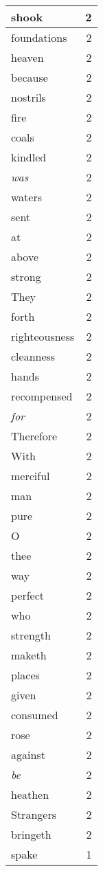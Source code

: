 \begin{center}
\begin{longtable}{l|r}
shook & 2 \\ \hline
foundations & 2 \\ \hline
heaven & 2 \\ \hline
because & 2 \\ \hline
nostrils & 2 \\ \hline
fire & 2 \\ \hline
coals & 2 \\ \hline
kindled & 2 \\ \hline
\emph{was} & 2 \\ \hline
waters & 2 \\ \hline
sent & 2 \\ \hline
at & 2 \\ \hline
above & 2 \\ \hline
strong & 2 \\ \hline
They & 2 \\ \hline
forth & 2 \\ \hline
righteousness & 2 \\ \hline
cleanness & 2 \\ \hline
hands & 2 \\ \hline
recompensed & 2 \\ \hline
\emph{for} & 2 \\ \hline
Therefore & 2 \\ \hline
With & 2 \\ \hline
merciful & 2 \\ \hline
man & 2 \\ \hline
pure & 2 \\ \hline
O & 2 \\ \hline
thee & 2 \\ \hline
way & 2 \\ \hline
perfect & 2 \\ \hline
who & 2 \\ \hline
strength & 2 \\ \hline
maketh & 2 \\ \hline
places & 2 \\ \hline
given & 2 \\ \hline
consumed & 2 \\ \hline
rose & 2 \\ \hline
against & 2 \\ \hline
\emph{be} & 2 \\ \hline
heathen & 2 \\ \hline
Strangers & 2 \\ \hline
bringeth & 2 \\ \hline
spake & 1 \\ \hline

\end{longtable}
\end{center}
